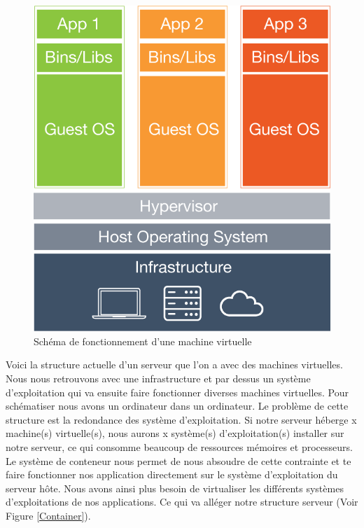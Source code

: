\documentclass{report}
\begin{document}
        \begin{figure}
          \begin{center}
            \includegraphics[scale=0.2]{images/virtualMachine.png}
          \end{center}
          \caption{Schéma de fonctionnement d'une machine virtuelle}
          \label{Virtual Machine}
        \end{figure}

        Voici la structure actuelle d’un serveur que l’on a avec des machines virtuelles. Nous nous retrouvons avec une infrastructure et par dessus un système d’exploitation qui va ensuite faire fonctionner diverses machines virtuelles. Pour schématiser nous avons un ordinateur dans un ordinateur. Le problème de cette structure est la redondance des système d’exploitation. Si notre serveur héberge x machine(s) virtuelle(s), nous aurons x système(s) d’exploitation(s) installer sur notre serveur, ce qui consomme beaucoup de ressources mémoires et processeurs.\\

        Le système de conteneur nous permet de nous absoudre de cette contrainte et te faire fonctionner nos application directement sur le système d’exploitation du serveur hôte. Nous avons ainsi plus besoin de virtualiser les différents systèmes d’exploitations de nos applications. Ce qui va alléger notre structure serveur (Voir Figure \ref{Container}).\\
\end{document}
